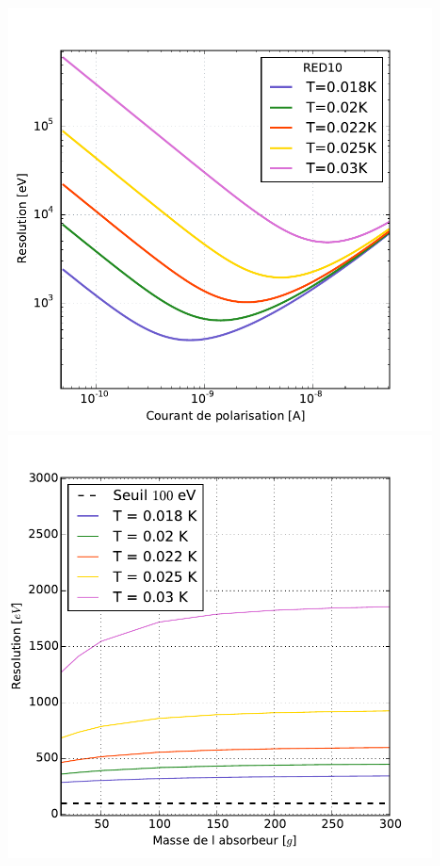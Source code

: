 \begin{figure}[!ht]
\begin{minipage}{0.49\textwidth}
\includegraphics[width=\textwidth]{Figures/Ethem/red10_i.pdf}
\end{minipage}
\hfill
\begin{minipage}{0.49\textwidth}
\includegraphics[width=\textwidth]{Figures/Ethem/red10_mass.pdf}

\end{minipage}
\end{figure}
